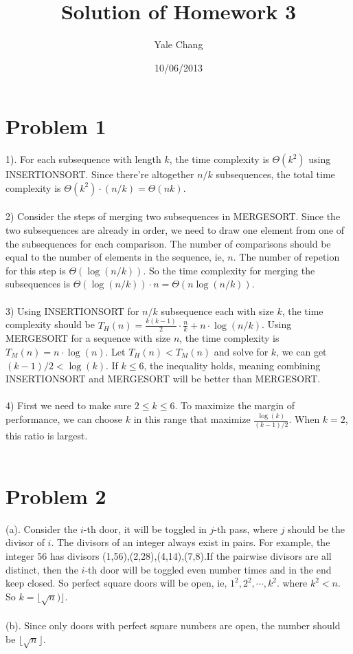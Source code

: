 \documentclass[11pt]{article}
\title{\textbf{Solution of Homework 3}}
\author{Yale Chang}
\date{10/06/2013}
\begin{document}
\maketitle

\section{Problem 1}
1). For each subsequence with length  $k$,  the time complexity is $\Theta(k^2)$ using INSERTIONSORT. Since there're altogether $n/k$ subsequences, the total time complexity is $\Theta(k^2)\cdot (n/k) = \Theta(nk)$.\\
\\
2) Consider the steps of merging two subsequences in MERGESORT. Since the two subsequences are already in order, we need to draw one element from one of the subsequences for each comparison. The number of comparisons should be equal to the number of elements in the sequence, ie, $n$. The number of repetion for this step is $\Theta(\log(n/k))$. So the time complexity for merging the subsequences is $\Theta(\log(n/k))\cdot n = \Theta(n\log(n/k))$.\\
\\
3) Using INSERTIONSORT for $n/k$ subsequence each with size $k$, the time complexity should be $T_{H}(n) = \frac{k(k-1)}{2}\cdot \frac{n}{k}+n\cdot\log(n/k)$. Using MERGESORT for a sequence with size $n$, the time complexity is $T_{M}(n) = n\cdot\log(n)$. Let $T_{H}(n)<T_{M}(n)$ and solve for $k$, we can get $(k-1)/2<\log(k)$. If $k\leq 6$, the inequality holds, meaning combining INSERTIONSORT and MERGESORT will be better than MERGESORT.\\
\\
4) First we need to make sure $2\leq k \leq 6$. To maximize the margin of performance, we can choose $k$ in this range that maximize $\frac{\log(k)}{(k-1)/2}$. When $k=2$, this ratio is largest.\\
\\
\section{Problem 2}
(a). Consider the $i$-th door, it will be toggled in $j$-th pass, where $j$ should be the divisor of $i$. The divisors of an integer always exist in pairs. For example, the integer 56 has divisors (1,56),(2,28),(4,14),(7,8).If the pairwise divisors are all distinct, then the $i$-th door will be toggled even number times and in the end keep closed. So perfect square doors will be open, ie, $1^2, 2^2,\cdots, k^2$. where $k^2<n$. So $k=\lfloor\sqrt{n})\rfloor$.\\
\\
(b). Since only doors with perfect square numbers are open, the number should be $\lfloor\sqrt{n}\rfloor$.  
\end{document}
